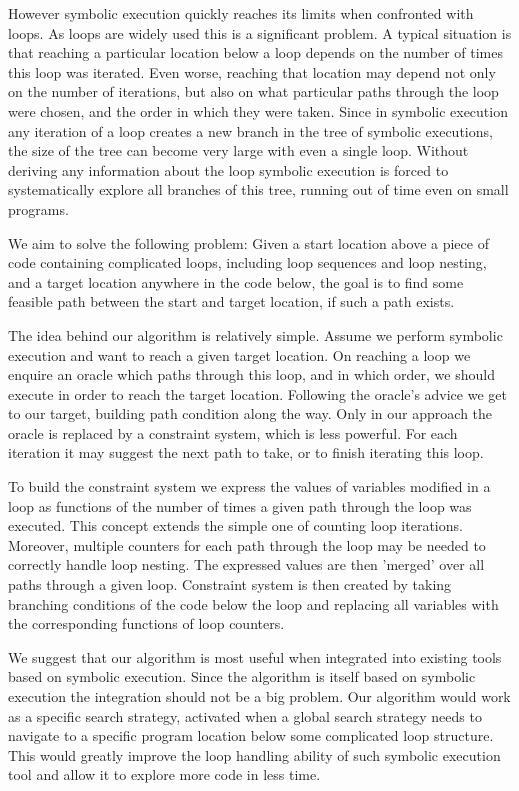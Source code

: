 \documentclass{llncs}
\begin{document}
However symbolic execution quickly reaches its limits when confronted with
loops. As loops are widely used this is a significant problem. A typical
situation is that reaching a particular location below a loop depends on the
number of times this loop was iterated. Even worse, reaching that location
may depend not only on the number of iterations, but also on what particular
paths through the loop were chosen, and the order in which they were
taken. Since in symbolic execution any iteration of a loop creates a new
branch in the tree of symbolic executions, the size of the tree can become
very large with even a single loop. Without deriving any information about
the loop symbolic execution is forced to systematically explore all branches
of this tree, running out of time even on small programs.

We aim to solve the following problem: Given
a start location above a piece of code containing complicated loops,
including loop sequences and loop nesting, and a target location anywhere in
the code below, the goal is to find some feasible path between the start and
target location, if such a path exists.

The idea behind our algorithm is relatively simple. Assume we perform symbolic execution and want
to reach a given target location. On reaching a loop we enquire an oracle
which paths through this loop, and in which order, we should execute in
order to reach the target location. Following the oracle's advice we get to
our target, building path condition along the way. Only in our approach
the oracle is replaced by a constraint system, which is less powerful. For
each iteration it may suggest the next path to take, or to finish iterating
this loop.

To build the constraint system we express the values of variables modified
in a loop as functions of the number of times a given path through the loop
was executed. This concept extends the simple one of counting loop
iterations. Moreover, multiple counters for each path through the loop may be
needed to correctly handle loop nesting. The expressed values are then 'merged' over
all paths through a given loop. Constraint system is then created by taking 
branching conditions of the code below the loop and replacing all variables
with the corresponding functions of loop counters.

We suggest that our algorithm is most useful when integrated into existing
tools based on symbolic execution. Since the algorithm is itself based on
symbolic execution the integration should not be a big problem. Our
algorithm would work as a specific search strategy, activated when a global
search strategy needs to navigate to a specific program location below some
complicated loop structure. This would greatly improve the loop handling
ability of such symbolic execution tool and allow it to explore more code in
less time.
\end{document}
